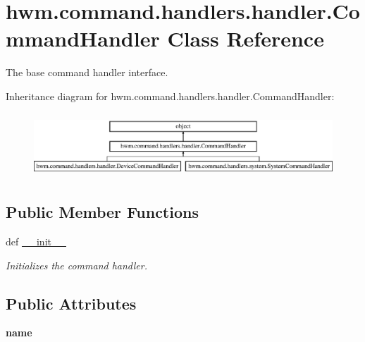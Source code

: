 \hypertarget{classhwm_1_1command_1_1handlers_1_1handler_1_1_command_handler}{\section{hwm.\-command.\-handlers.\-handler.\-Command\-Handler Class Reference}
\label{classhwm_1_1command_1_1handlers_1_1handler_1_1_command_handler}
}


The base command handler interface.  


Inheritance diagram for hwm.\-command.\-handlers.\-handler.\-Command\-Handler\-:\begin{figure}[H]
\begin{center}
\leavevmode
\includegraphics[height=2.427746cm]{classhwm_1_1command_1_1handlers_1_1handler_1_1_command_handler}
\end{center}
\end{figure}
\subsection*{Public Member Functions}
\begin{DoxyCompactItemize}
\item 
def \hyperlink{classhwm_1_1command_1_1handlers_1_1handler_1_1_command_handler_a3b4250e1a9908112b946dbc010373999}{\-\_\-\-\_\-init\-\_\-\-\_\-}
\begin{DoxyCompactList}\small\item\em Initializes the command handler. \end{DoxyCompactList}\end{DoxyCompactItemize}
\subsection*{Public Attributes}
\begin{DoxyCompactItemize}
\item 
\hypertarget{classhwm_1_1command_1_1handlers_1_1handler_1_1_command_handler_aeae3e505cc026285e12444cf0eb64c69}{{\bfseries name}}\label{classhwm_1_1command_1_1handlers_1_1handler_1_1_command_handler_aeae3e505cc026285e12444cf0eb64c69}

\end{DoxyCompactItemize}


